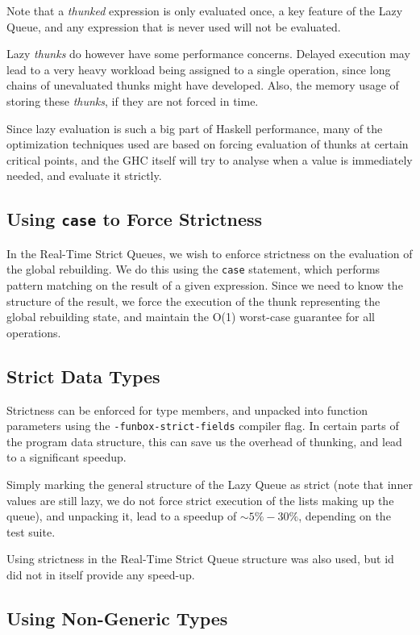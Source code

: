 Note that a \textit{thunked} expression is only evaluated once, a key feature of the Lazy Queue, and any expression that is never used will not be evaluated. 

Lazy \textit{thunks} do however have some performance concerns. Delayed execution may lead to a very heavy workload being assigned to a single operation, since long chains of unevaluated thunks might have developed. Also, the memory usage of storing these \textit{thunks}, if they are not forced in time.

Since lazy evaluation is such a big part of Haskell performance, many of the optimization techniques used are based on forcing evaluation of thunks at certain critical points, and the GHC itself will try to analyse when a value is immediately needed, and evaluate it strictly.

\subsection{Using \texttt{case} to Force Strictness}

In the Real-Time Strict Queues, we wish to enforce strictness on the evaluation of the global rebuilding. We do this using the \texttt{case} statement, which performs pattern matching on the result of a given expression. Since we need to know the structure of the result, we force the execution of the thunk representing the global rebuilding state, and maintain the O(1) worst-case guarantee for all operations.

\subsection{Strict Data Types} Strictness can be enforced for type members, and unpacked into function parameters using the \texttt{-funbox-strict-fields} compiler flag. In certain parts of the program data structure, this can save us the overhead of thunking, and lead to a significant speedup.

Simply marking the general structure of the Lazy Queue as strict (note that inner values are still lazy, we do not force strict execution of the lists making up the queue), and unpacking it, lead to a speedup of $\sim 5\%-30\%$, depending on the test suite.

Using strictness in the Real-Time Strict Queue structure was also used, but id did not in itself provide any speed-up.

\subsection{Using Non-Generic Types}

